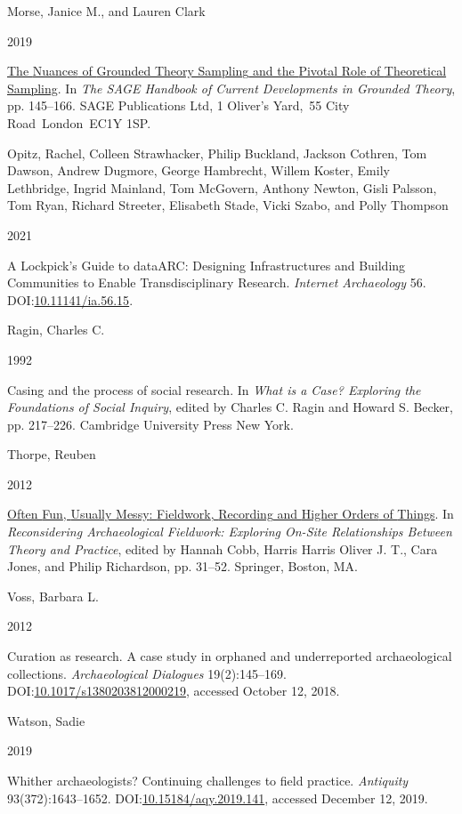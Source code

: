 \documentclass[
]{article}
\newlength{\cslhangindent}
\newlength{\csllabelwidth}
\newenvironment{CSLReferences}[2] %
 {\begin{list}{}{%
  \setlength{\itemindent}{0pt}
  \setlength{\leftmargin}{0pt}
  \setlength{\parsep}{0pt}
  \ifodd #1
   \setlength{\leftmargin}{\cslhangindent}
   \setlength{\itemindent}{-1\cslhangindent}
  \fi
  \setlength{\itemsep}{#2\baselineskip}}}
 {\end{list}}
\newcommand{\CSLBlock}[1]{\hfill\break\parbox[t]{\linewidth}{\strut\ignorespaces#1\strut}}
\newcommand{\CSLLeftMargin}[1]{\parbox[t]{\csllabelwidth}{\strut#1\strut}}
\newcommand{\CSLRightInline}[1]{\parbox[t]{\linewidth - \csllabelwidth}{\strut#1\strut}}
\begin{document}
\begin{CSLReferences}{0}{1}
\CSLBlock{Morse, Janice M., and Lauren Clark}
\CSLLeftMargin{ 2019}%
\CSLRightInline{\href{https://doi.org/10.4135/9781526436061.n9}{The
{Nuances} of {Grounded Theory Sampling} and the {Pivotal Role} of
{Theoretical Sampling}}. In \emph{The {SAGE Handbook} of {Current
Developments} in {Grounded Theory}}, pp. 145--166. SAGE Publications
Ltd, 1 Oliver's Yard,~55 City Road~London~EC1Y 1SP.}

\CSLBlock{Opitz, Rachel, Colleen Strawhacker, Philip Buckland, Jackson
Cothren, Tom Dawson, Andrew Dugmore, George Hambrecht, Willem Koster,
Emily Lethbridge, Ingrid Mainland, Tom McGovern, Anthony Newton, Gisli
Palsson, Tom Ryan, Richard Streeter, Elisabeth Stade, Vicki Szabo, and
Polly Thompson}
\CSLLeftMargin{ 2021}%
\CSLRightInline{A {Lockpick}'s {Guide} to {dataARC}: {Designing
Infrastructures} and {Building Communities} to {Enable Transdisciplinary
Research}. \emph{Internet Archaeology} 56.
DOI:\href{https://doi.org/10.11141/ia.56.15}{10.11141/ia.56.15}.}

\CSLBlock{Ragin, Charles C.}
\CSLLeftMargin{ 1992}%
\CSLRightInline{Casing and the process of social research. In \emph{What
is a {Case}? {Exploring} the {Foundations} of {Social Inquiry}}, edited
by Charles C. Ragin and Howard S. Becker, pp. 217--226. Cambridge
University Press New York.}

\CSLBlock{Thorpe, Reuben}
\CSLLeftMargin{ 2012}%
\CSLRightInline{\href{https://doi.org/10.1007/978-1-4614-2338-6_3}{Often
{Fun}, {Usually Messy}: {Fieldwork}, {Recording} and {Higher Orders} of
{Things}}. In \emph{Reconsidering {Archaeological Fieldwork}: {Exploring
On-Site Relationships Between Theory} and {Practice}}, edited by Hannah
Cobb, Harris Harris Oliver J. T., Cara Jones, and Philip Richardson, pp.
31--52. Springer, Boston, MA.}

\CSLBlock{Voss, Barbara L.}
\CSLLeftMargin{ 2012}%
\CSLRightInline{Curation as research. {A} case study in orphaned and
underreported archaeological collections. \emph{Archaeological
Dialogues} 19(2):145--169.
DOI:\href{https://doi.org/10.1017/s1380203812000219}{10.1017/s1380203812000219},
accessed October 12, 2018.}

\CSLBlock{Watson, Sadie}
\CSLLeftMargin{ 2019}%
\CSLRightInline{Whither archaeologists? {Continuing} challenges to field
practice. \emph{Antiquity} 93(372):1643--1652.
DOI:\href{https://doi.org/10.15184/aqy.2019.141}{10.15184/aqy.2019.141},
accessed December 12, 2019.}


\end{CSLReferences}
\end{document}
